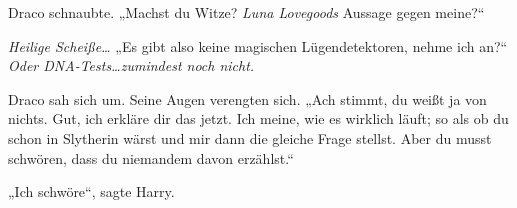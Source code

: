 Draco schnaubte. „Machst du Witze? \emph{Luna Lovegoods} Aussage gegen meine?“

\emph{Heilige Scheiße…} „Es gibt also keine magischen Lügendetektoren, nehme ich an?“ \emph{Oder DNA-Tests…zumindest noch nicht.}

Draco sah sich um. Seine Augen verengten sich. „Ach stimmt, du weißt ja von nichts. Gut, ich erkläre dir das jetzt. Ich meine, wie es wirklich läuft; so als ob du schon in Slytherin wärst und mir dann die gleiche Frage stellst. Aber du musst schwören, dass du niemandem davon erzählst.“






„Ich schwöre“, sagte Harry.

